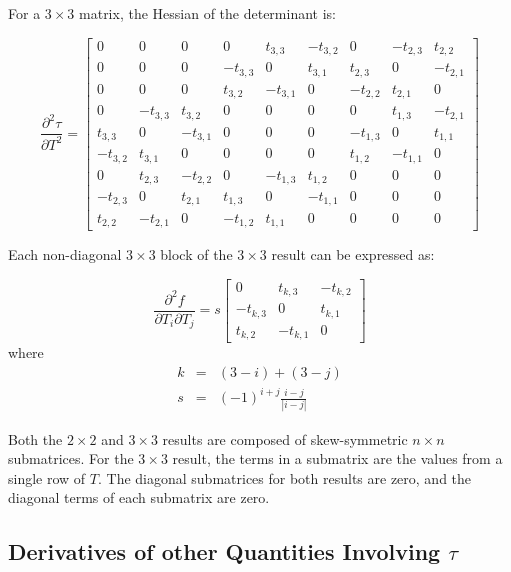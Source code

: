 \documentclass{report}
\begin{document}
\noindent For a $3 \times 3$ matrix, the Hessian of the determinant is:

\begin{equation}
\label{2ndtau3d}
\frac{\partial^2 \tau}{\partial T^2} =
\left[ \begin{array}{ccccccccc}
 0 & 0 & 0 & 0 & t_{3,3} & -t_{3,2} & 0 & -t_{2,3} & t_{2,2} \\
 0 & 0 & 0 & -t_{3,3} & 0 & t_{3,1} & t_{2,3} & 0 & -t_{2,1} \\
 0 & 0 & 0 & t_{3,2} & -t_{3,1} & 0 & -t_{2,2} & t_{2,1} & 0 \\
 0 & -t_{3,3} & t_{3,2} & 0 & 0 & 0 & 0 & t_{1,3} & -t_{2,1} \\
 t_{3,3} & 0 & -t_{3,1} & 0 & 0 & 0 & -t_{1,3} & 0 & t_{1,1} \\
 -t_{3,2} & t_{3,1} & 0 & 0 & 0 & 0 & t_{1,2} & -t_{1,1} & 0 \\
 0 & t_{2,3} & -t_{2,2} & 0 & -t_{1,3} & t_{1,2} & 0 & 0 & 0 \\
 -t_{2,3} & 0 & t_{2,1} & t_{1,3} & 0 & -t_{1,1} & 0 & 0 & 0 \\
 t_{2,2} & -t_{2,1} & 0 & -t_{1,2} & t_{1,1} & 0 & 0 & 0 & 0
\end{array} \right]
\end{equation}

\noindent Each non-diagonal $3 \times 3$ block of the $3 \times 3$ result can be expressed as:

\begin{equation}
\label{3dtauhessblock}
\frac{\partial^2 f}{\partial T_i \partial T_j}
 = s\left[\begin{array}{ccc}
0 & t_{k,3} & -t_{k,2} \\
-t_{k,3} & 0 & t_{k,1} \\
t_{k,2} & -t_{k,1} & 0 
\end{array}\right]\end{equation}
where 
\begin{eqnarray}
k &=& (3-i) + (3-j) \\
s &=& (-1)^{i+j}\frac{i-j}{|i-j|}
\end{eqnarray}

\noindent Both the $2 \times 2$ and $3 \times 3$ results are composed of skew-symmetric $n \times n$ submatrices.  For the $3 \times 3$ result, the terms in a submatrix are the values from a single row of $T$.  The diagonal submatrices for both results are zero, and the diagonal terms of each submatrix are zero.

\subsection{Derivatives of other Quantities Involving $\tau$}
\end{document}
